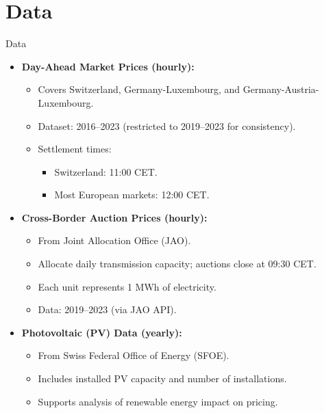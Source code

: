 \documentclass[aspectratio=169,xcolor=dvipsnames]{beamer}
\begin{document}
\section{Data}
\begin{frame}{Data}
\begin{itemize}
    \item \textbf{Day-Ahead Market Prices (hourly):}
    \begin{itemize}
        \item Covers Switzerland, Germany-Luxembourg, and Germany-Austria-Luxembourg.
        \item Dataset: 2016–2023 (restricted to 2019–2023 for consistency).
        \item Settlement times:
        \begin{itemize}
            \item Switzerland: 11:00 CET.
            \item Most European markets: 12:00 CET.
        \end{itemize}
    \end{itemize}
    \item \textbf{Cross-Border Auction Prices (hourly):}
    \begin{itemize}
        \item From Joint Allocation Office (JAO).
        \item Allocate daily transmission capacity; auctions close at 09:30 CET.
        \item Each unit represents 1 MWh of electricity.
        \item Data: 2019–2023 (via JAO API).
    \end{itemize}
    \item \textbf{Photovoltaic (PV) Data (yearly):}
    \begin{itemize}
        \item From Swiss Federal Office of Energy (SFOE).
        \item Includes installed PV capacity and number of installations.
        \item Supports analysis of renewable energy impact on pricing.
    \end{itemize}
\end{itemize}
\end{frame}
\end{document}
